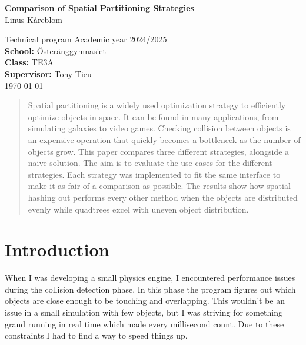 \documentclass[a4paper, 12pt]{article}
\begin{document}
\begin{titlepage}
    \centering
    \vspace*{1cm}

    {\Huge \textbf{Comparison of Spatial Partitioning Strategies}}\\[1.5cm]

    {\large Linus Kåreblom}\\[1cm]

    \vfill

    Technical program Academic year 2024/2025\\
    \textbf{School:} Österänggymnasiet\\
    \textbf{Class:} TE3A\\
    \textbf{Supervisor:} Tony Tieu\\

    \vspace{1cm}
    {\today}
\end{titlepage}

\begin{abstract}
    Spatial partitioning is a widely used optimization strategy to efficiently
    optimize objects in space. It can be found in many applications, from
    simulating galaxies to video games.
    Checking collision between objects is an expensive operation that quickly
    becomes a bottleneck as the number of objects grow.
    This paper compares three different strategies, alongside a naive solution.
    The aim is to evaluate the use cases for the different strategies.
    Each strategy was implemented to fit the same interface to make it as fair
    of a comparison as possible.
    The results show how spatial hashing out performs every other method when
    the objects are distributed evenly while quadtrees excel with uneven object
    distribution.
\end{abstract}

\newpage

\tableofcontents
\newpage

\section{Introduction}
When I was developing a small physics engine, I encountered performance issues
during the  collision detection phase. In this phase the program figures out
which objects are close enough to be touching and overlapping. This wouldn't be
an issue in a small simulation with few objects, but I was striving for
something grand running in real time which made every millisecond count. Due to
these constraints I had to find a way to speed things up.
\end{document}
